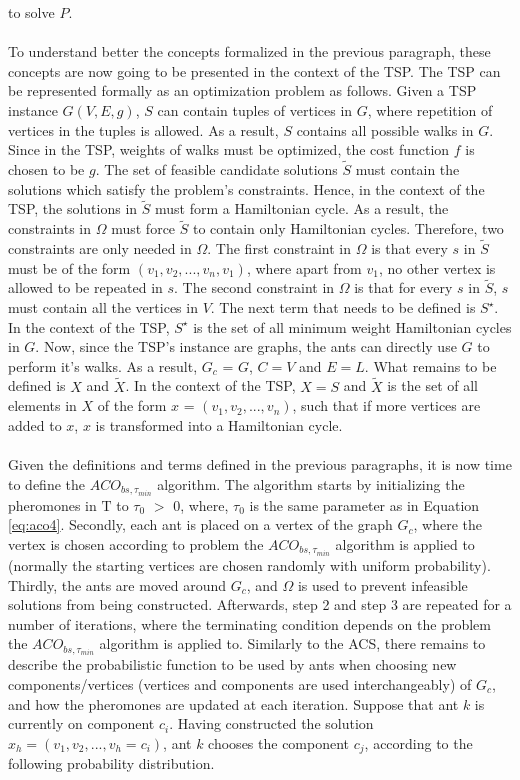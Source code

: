 \documentclass[12pt]{article}
\numberwithin{equation}{subsection}
\numberwithin{table}{subsection}
\numberwithin{algorithm}{subsection}
\numberwithin{figure}{subsection}
\begin{document}
to solve $P$. \cite{dorigo_stutzle_thomas_2004}\\\\
To understand better the concepts formalized in the previous paragraph, these concepts are now going to be presented in the context of the TSP. The TSP can be represented formally as an optimization problem as follows. Given a TSP instance $G(V,E,g)$, $S$ can contain tuples of vertices in $G$, where repetition of vertices in the tuples is allowed. As a result, $S$ contains all possible walks in $G$. Since in the TSP, weights of walks must be optimized, the cost function $f$ is chosen to be $g$. The set of feasible candidate solutions $\widetilde{S}$ must contain the solutions which satisfy the problem's constraints. Hence, in the context of the TSP, the solutions in $\widetilde{S}$ must form a Hamiltonian cycle. As a result, the constraints in $\Omega$ must force $\widetilde{S}$ to contain only Hamiltonian cycles. Therefore, two constraints are only needed in $\Omega$. The first constraint in $\Omega$ is that every $s$ in $\widetilde{S}$ must be of the form $(v_1, v_2, ...,v_n, v_1)$, where apart from $v_1$, no other vertex is allowed to be repeated in $s$. The second constraint in $\Omega$ is that for every $s$ in $\widetilde{S}$, $s$ must contain all the vertices in $V$. The next term that needs to be defined is $S^\star$. In the context of the TSP, $S^\star$ is the set of all minimum weight Hamiltonian cycles in $G$. Now, since the TSP's instance are graphs, the ants can directly use $G$ to perform it's walks. As a result, $G_c$ = $G$, $C = V$ and $E=L$. What remains to be defined is $X$ and $\widetilde{X}$. In the context of the TSP, $X=S$ and $\widetilde{X}$ is the set of all elements in $X$ of the form $x$ = $(v_1, v_2, ..., v_n)$, such that if more vertices are added to $x$, $x$ is transformed into a Hamiltonian cycle.\\\\
Given the definitions and terms defined in the previous paragraphs, it is now time to define the $ACO_{bs, \tau_{min}}$ algorithm. The algorithm starts by initializing the pheromones in $\mathrm{T}$ to $\tau_0$ $>$ 0, where, $\tau_0$ is the same parameter as in Equation \ref{eq:aco4}. Secondly, each ant is placed on a vertex of the graph $G_c$, where the vertex is chosen according to problem the $ACO_{bs, \tau_{min}}$ algorithm is applied to (normally the starting vertices are chosen randomly with uniform probability). Thirdly, the ants are moved around $G_c$, and $\Omega$ is used to prevent infeasible solutions from being constructed. Afterwards, step 2 and step 3 are repeated for a number of iterations, where the terminating condition depends on the problem the $ACO_{bs, \tau_{min}}$ algorithm is applied to. Similarly to the ACS, there remains to describe the probabilistic function to be used by ants when choosing new components/vertices (vertices and components are used interchangeably) of $G_c$, and how the pheromones are updated at each iteration. Suppose that ant $k$ is currently on component $c_i$. Having constructed the solution $x_h= (v_1, v_2, ..., v_h = c_i)$, ant $k$ chooses the component $c_j$, according to the following probability distribution.
\end{document}
